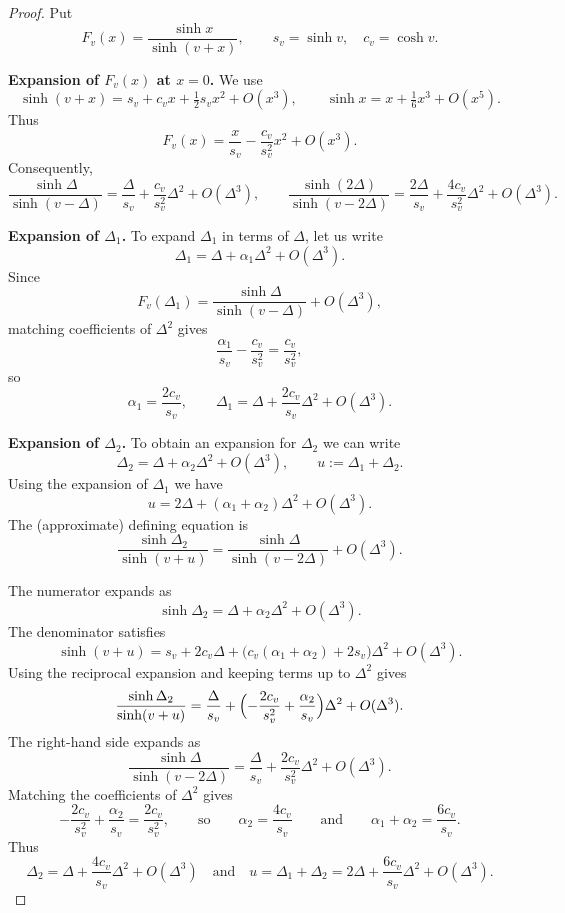 \documentclass[11pt,twoside,reqno]{amsart}
\def\DD{{\mathcal{D}}}
\def\DD{\Delta}
\def\a{\alpha}
\theoremstyle{plain}
\numberwithin{equation}{section}
\begin{document}
\begin{proof}
	Put
	\[
	F_v(x)=\frac{\sinh x}{\sinh(v+x)}, 
	\qquad s_v=\sinh v,\quad c_v=\cosh v.
	\]
	
	\medskip
	\noindent\textbf{Expansion of $F_v(x)$ at $x=0$.}  
	We use
	\[
	\sinh(v+x)=s_v + c_v x + \tfrac12 s_v x^2 + O(x^3), 
	\qquad
	\sinh x = x + \tfrac{1}{6}x^3 + O(x^5).
	\]
	Thus
	\[
	F_v(x)
	= \frac{x}{s_v} - \frac{c_v}{s_v^2}x^2 + O(x^3).
	\]
	Consequently,
	\[
	\frac{\sinh \Delta}{\sinh(v-\Delta)}
	= \frac{\Delta}{s_v} + \frac{c_v}{s_v^2}\Delta^2 + O(\Delta^3),
	\qquad
	\frac{\sinh (2\Delta)}{\sinh(v-2\Delta)}
	= \frac{2\Delta}{s_v} + \frac{4c_v}{s_v^2}\Delta^2 + O(\Delta^3).
	\]
	
	\medskip
	\noindent\textbf{Expansion of $\Delta_1$.}
	To expand $\DD_1$ in terms of $\DD$, let us write
	\[
	\Delta_1=\Delta+\alpha_1 \Delta^2+O(\Delta^3).
	\]
	Since
	\[
	F_v(\Delta_1)=\frac{\sinh\Delta}{\sinh(v-\Delta)} + O(\Delta^3),
	\]
	matching coefficients of $\Delta^2$ gives
	\[
	\frac{\alpha_1}{s_v}-\frac{c_v}{s_v^2}= \frac{c_v}{s_v^2},
	\]
	so
	\[
	\alpha_1=\frac{2c_v}{s_v},
	\qquad
	\Delta_1=\Delta+\frac{2c_v}{s_v}\Delta^2+O(\Delta^3).
	\]
	
	\medskip
	\noindent\textbf{Expansion of $\Delta_2$.} 
	To obtain an expansion for $\DD_2$ we can write
	\[
	\Delta_2=\Delta+\alpha_2\Delta^2+O(\Delta^3),\qquad
	u:=\Delta_1+\Delta_2.
	\]
	Using the expansion of $\Delta_1$ we have
	\[
	u=2\Delta+(\alpha_1+\alpha_2)\Delta^2+O(\Delta^3).
	\]
	The (approximate) defining equation is
	\[
	\frac{\sinh\Delta_2}{\sinh(v+u)}
	= \frac{\sinh\Delta}{\sinh(v-2\Delta)} + O(\Delta^3).
	\]
	
	The numerator expands as
	\[
	\sinh\Delta_2=\Delta+\alpha_2\Delta^2+O(\Delta^3).
	\]
	The denominator satisfies
	\[
	\sinh(v+u)=s_v + 2c_v\Delta 
	+ \bigl(c_v(\alpha_1+\alpha_2)+2s_v\bigr)\Delta^2 + O(\Delta^3).
	\]
	Using the reciprocal expansion and keeping terms up to $\Delta^2$ gives
	\[
	\frac{\sinh\Delta_2}{\sinh(v+u)}
	= \frac{\Delta}{s_v}
	+ \Bigl(-\frac{2c_v}{s_v^2}+\frac{\alpha_2}{s_v}\Bigr)\Delta^2
	+ O(\Delta^3).
	\]
	The right-hand side expands as
	\[
	\frac{\sinh\Delta}{\sinh(v-2\Delta)}
	= \frac{\Delta}{s_v} + \frac{2c_v}{s_v^2}\Delta^2 + O(\Delta^3).
	\]
	Matching the coefficients of $\Delta^2$ gives
	\[
	-\frac{2c_v}{s_v^2}+\frac{\alpha_2}{s_v}
	= \frac{2c_v}{s_v^2},
	\qquad
	\text{so}\qquad
	\alpha_2=\frac{4c_v}{s_v}\qquad
	\text{and}\qquad
\a_1+	\alpha_2=\frac{6c_v}{s_v}.
	\]
	Thus
	\[
	\Delta_2=\Delta+\frac{4c_v}{s_v}\Delta^2+O(\Delta^3)\quad\text{and}\quad
	u=\Delta_1+\Delta_2=2\Delta+\frac{6c_v}{s_v}\Delta^2+O(\Delta^3).
	\]
	

\end{proof}
\end{document}

